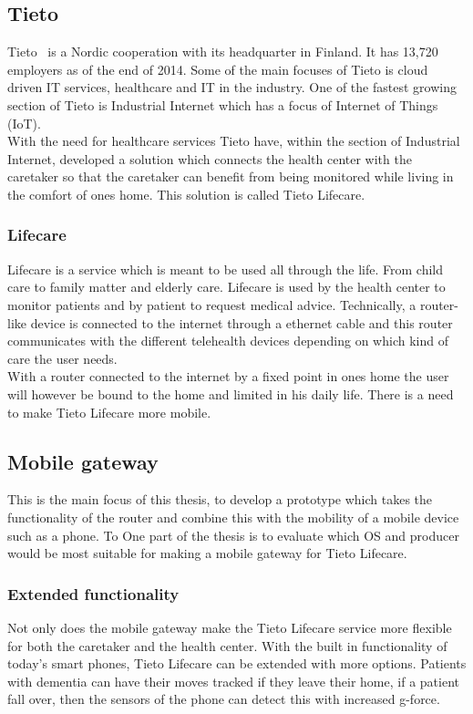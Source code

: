 
\subsection{Tieto}
\label{sub:tieto}
	Tieto~\cite{tieto} is a Nordic cooperation with its headquarter in Finland. It has 13,720 employers as of the end of 2014. Some of the main focuses of Tieto is cloud driven IT services, healthcare and IT in the industry. One of the fastest growing section of Tieto is Industrial Internet which has a focus of Internet of Things (IoT).\\
	With the need for healthcare services Tieto have, within the section of Industrial Internet, developed a solution which connects the health center with the caretaker so that the caretaker can benefit from being monitored while living in the comfort of ones home. This solution is called Tieto Lifecare.

\subsubsection{Lifecare}
\label{subsub:lifecare}
	Lifecare is a service which is meant to be used all through the life. From child care to family matter and elderly care. Lifecare is used by the health center to monitor patients and by patient to request medical advice. Technically, a router-like device is connected to the internet through a ethernet cable and this router communicates with the different telehealth devices depending on which kind of care the user needs.\\
	With a router connected to the internet by a fixed point in ones home the user will however be bound to the home and limited in his daily life. There is a need to make Tieto Lifecare more mobile.

\subsection{Mobile gateway}
\label{sub:gateway}
	This is the main focus of this thesis, to develop a prototype which takes the functionality of the router and combine this with the mobility of a mobile device such as a phone. To 
	One part of the thesis is to evaluate which OS and producer would be most suitable for making a mobile gateway for Tieto Lifecare.
	

\subsubsection{Extended functionality}
\label{subsub:extendedFunc}
	Not only does the mobile gateway make the Tieto Lifecare service more flexible for both the caretaker and the health center. With the built in functionality of today's smart phones, Tieto Lifecare can be extended with more options. Patients with dementia can have their moves tracked if they leave their home, if a patient fall over, then the sensors of the phone can detect this with increased g-force.


